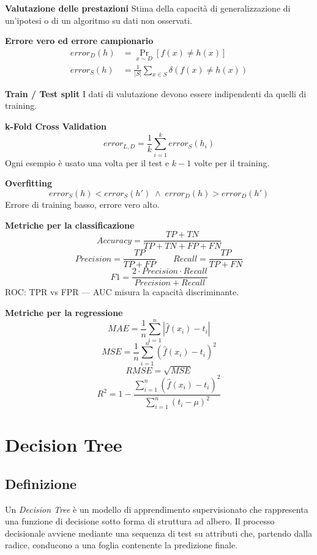 \documentclass[a4paper,12pt]{report}
\begin{document}
\begin{tcolorbox}[
    colback=green!10,
    colframe=green!50!black,
    boxrule=0.4pt,
    left=6pt,
    right=6pt,
    top=6pt,
    bottom=6pt,
    breakable
]

\textbf{Valutazione delle prestazioni}  
Stima della capacità di generalizzazione di un’ipotesi o di un algoritmo su dati non osservati.

\medskip
\textbf{Errore vero ed errore campionario}
\[
\begin{aligned}
error_D(h) &= \Pr_{x \sim D}[f(x) \neq h(x)] \\
error_S(h) &= \frac{1}{|S|} \sum_{x \in S} \delta(f(x) \neq h(x))
\end{aligned}
\]

\medskip
\textbf{Train / Test split}  
I dati di valutazione devono essere indipendenti da quelli di training.

\medskip
\textbf{k-Fold Cross Validation}
\[
error_{L,D} = \frac{1}{k} \sum_{i=1}^{k} error_S(h_i)
\]
Ogni esempio è usato una volta per il test e \(k-1\) volte per il training.

\medskip
\textbf{Overfitting}
\[
error_S(h) < error_S(h') \;\land\; error_D(h) > error_D(h')
\]
Errore di training basso, errore vero alto.

\medskip
\textbf{Metriche per la classificazione}
\[
Accuracy = \frac{TP + TN}{TP + TN + FP + FN}
\]
\[
Precision = \frac{TP}{TP + FP}
\qquad
Recall = \frac{TP}{TP + FN}
\]
\[
F1 = \frac{2 \cdot Precision \cdot Recall}{Precision + Recall}
\]
ROC: TPR vs FPR — AUC misura la capacità discriminante.

\medskip
\textbf{Metriche per la regressione}
\[
MAE = \frac{1}{n} \sum_{i=1}^{n} \left| \hat{f}(x_i) - t_i \right|
\]
\[
MSE = \frac{1}{n} \sum_{i=1}^{n} \left(\hat{f}(x_i) - t_i \right)^2
\]
\[
RMSE = \sqrt{MSE}
\]
\[
R^2 = 1 -
\frac{\sum_{i=1}^{n} (\hat{f}(x_i) - t_i)^2}
{\sum_{i=1}^{n} (t_i - \mu)^2}
\]

\medskip

\end{tcolorbox}

\chapter{Decision Tree}
\section{Definizione}

Un \textit{Decision Tree} è un modello di apprendimento supervisionato che rappresenta una funzione di decisione sotto forma di struttura ad albero.
Il processo decisionale avviene mediante una sequenza di test su attributi che, partendo dalla radice, conducono a una foglia contenente la predizione finale.
\end{document}

